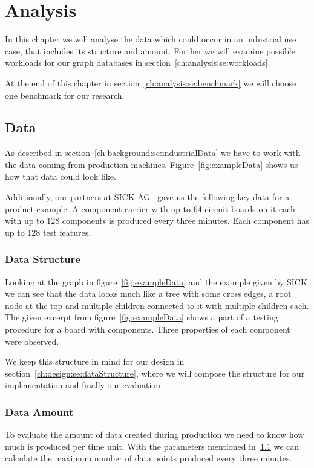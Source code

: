 \chapter{Analysis}
\label{ch:analysis}
In this chapter we will analyse the data which could occur in an industrial use case,
that includes its structure and amount.
Further we will examine possible workloads for our graph databases in section~\ref{ch:analysis:se:workloads}.

At the end of this chapter in section~\ref{ch:analysis:se:benchmark} we will choose one benchmark for our research.

\section{Data}
\label{ch:analysis:se:data}
As described in section~\ref{ch:background:se:industrialData} we have to work with the data coming from production machines.
Figure~\ref{fig:exampleData} shows us how that data could look like.

Additionally,
our partners at SICK AG~\cite{SICK} gave us the following key data for a product example.
A component carrier with up to 64 circuit boards on it each with up to 128 components is produced every three minutes.
Each component has up to 128 test features.

\subsection{Data Structure}
Looking at the graph in figure~\ref{fig:exampleData} and the example given by SICK we can see that the data looks much like a tree with some cross edges,
a root node at the top and multiple children connected to it with multiple children each.
The given excerpt from figure~\ref{fig:exampleData} shows a part of a testing procedure for a board with components.
Three properties of each component were observed.

We keep this structure in mind for our design in section~\ref{ch:design:se:dataStructure},
where we will compose the structure for our implementation and finally our evaluation.

\subsection{Data Amount}
\label{ch:analysis:se:dataAmount}
To evaluate the amount of data created during production we need to know how much is produced per time unit.
With the parameters mentioned in~\ref{ch:analysis:se:data} we can calculate the maximum number of data points produced every three minutes.


